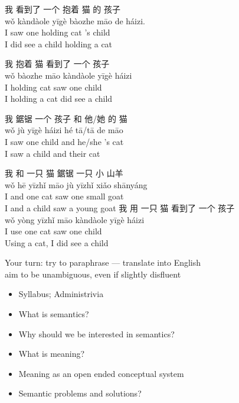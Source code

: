 \documentclass[a4paper,landscape,headrule,footrule,xetex,25pt]{foils}
\begin{document}
\begin{exe}
  \ex \glll 我 看到了 一个 抱着 猫 的 孩子 \\
  wǒ   kàndàole    yīgè   bàozhe  māo  de    háizi. \\
  I saw one holding cat 's child \\
  \trans I did see a child holding a cat

  \ex \glll 我 抱着 猫 看到了 一个 孩子 \\
  wǒ  bàozhe māo kàndàole  yīgè     háizi \\
  I holding cat saw one  child \\
 \trans I holding a cat did see a child

  \ex \glll 我 鋸锯  一个 孩子 和 他/她 的 猫 \\
wǒ jù  yīgè    háizi  hé  tā/tā   de māo \\
 I      saw    one    child   and     he/she  's cat\\
 \trans I saw  a child and their cat 

  \ex \glll 我 和 一只 猫 鋸锯 一只 小 山羊 \\
wǒ hē  yīzhǐ  māo jù yīzhǐ xiǎo  shānyáng  \\
I and one cat saw one small goat \\

\trans I and a child saw a young goat
  \ex \glll 我 用 一只 猫 看到了 一个 孩子 \\
wǒ yòng yīzhǐ  māo kàndàole  yīgè  háizi \\
I use one cat saw one child \\
\trans Using a cat, I did see a child
\end{exe}

\bigskip
\begin{center} \large
  Your turn: try to paraphrase --- translate into English
  \\ aim to be unambiguous, even if slightly disfluent\task
\end{center}

\begin{itemize}
\item Syllabus; Administrivia
\item What is semantics?
\item Why should we be interested in semantics?
\item What is meaning?
\item Meaning as an open ended conceptual system
\item Semantic problems and solutions?
\end{itemize}
\end{document}
